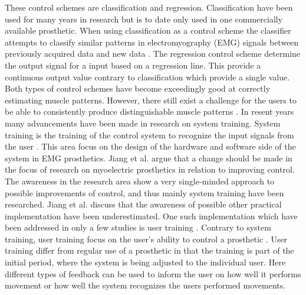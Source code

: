 These control schemes are classification and regression. Classification have been used for many years in research but is to date only used in one commercially available prosthetic. When using classification as a control scheme the classifier attempts to classify similar patterns in electromyography (EMG) signals between previously acquired data and new data \cite{Mendez2017}. The regression control scheme determine the output signal for a input based on a regression line. This provide a continuous output value contrary to classification which provide a single value. \cite{Hahne2014} \\
Both types of control schemes have become exceedingly good at correctly estimating muscle patterns. \cite{Hahne2014, Bruun2017, Englehart2003, Scheme2015} However, there still exist a challenge for the users to be able to consistently produce distinguishable muscle patterns \cite{Powell2014}. In resent years many advancements have been made in research on system training. System training is the training of the control system to recognize the input signals from the user \cite{Fougner2012}. This area focus on the design of the hardware and software side of the system in EMG prosthetics. Jiang et al. \cite{Jiang2012} argue that a change should be made in the focus of research on myoelectric prosthetics in relation to improving control. The awareness in the research area show a very single-minded approach to possible improvements of control, and thus mainly system training have been researched. Jiang et al. \cite{Jiang2012} discuss that the awareness of possible other practical implementation have been underestimated. One such implementation which have been addressed in only a few studies is user training \cite{Fang2017, Powell2014, Pan2017}. Contrary to system training, user training focus on the user's ability to control a prosthetic \cite{Fougner2012}. User training differ from regular use of a prosthetic in that the training is part of the initial period, where the system is being adjusted to the individual user. Here different types of feedback can be used to inform the user on how well it performs movement or how well the system recognizes the users performed movements. \cite{Powell2014,Simon2013} \\
